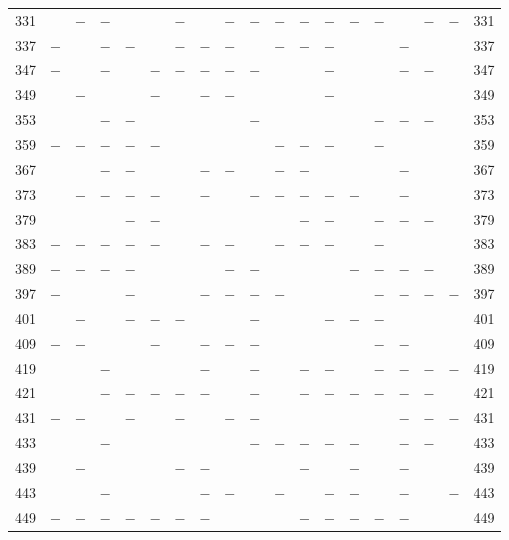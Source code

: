 \begin{center}
\begin{tabular}{r|c|c|c|c|c|c|c|c|c|c|c|c|c|c|c|c|c|r}
331 &  & $-$ & $-$ &  &  & $-$ &  & $-$ & $-$ & $-$ & $-$ & $-$ & $-$ & $-$ &  & $-$ & $-$ & 331\\
337 & $-$ &  & $-$ & $-$ &  & $-$ & $-$ & $-$ &  & $-$ & $-$ & $-$ &  &  & $-$ &  &  & 337\\
347 & $-$ &  & $-$ &  & $-$ & $-$ & $-$ & $-$ & $-$ &  &  & $-$ &  &  & $-$ & $-$ &  & 347\\
349 &  & $-$ &  &  & $-$ &  & $-$ & $-$ &  &  &  & $-$ &  &  &  &  &  & 349\\
353 &  &  & $-$ & $-$ &  &  &  &  & $-$ &  &  &  &  & $-$ & $-$ & $-$ &  & 353\\
359 & $-$ & $-$ & $-$ & $-$ & $-$ &  &  &  &  & $-$ & $-$ & $-$ &  & $-$ &  &  &  & 359\\
367 &  &  & $-$ & $-$ &  &  & $-$ & $-$ &  & $-$ & $-$ &  &  &  & $-$ &  &  & 367\\
373 &  & $-$ & $-$ & $-$ & $-$ &  & $-$ &  & $-$ & $-$ & $-$ & $-$ & $-$ &  & $-$ &  &  & 373\\
379 &  &  &  & $-$ & $-$ &  &  &  &  &  & $-$ & $-$ &  & $-$ & $-$ & $-$ &  & 379\\
383 & $-$ & $-$ & $-$ & $-$ & $-$ &  & $-$ & $-$ &  & $-$ & $-$ & $-$ &  & $-$ &  &  &  & 383\\
389 & $-$ & $-$ & $-$ & $-$ &  &  &  & $-$ & $-$ &  &  &  & $-$ & $-$ & $-$ & $-$ &  & 389\\
397 & $-$ &  &  & $-$ &  &  & $-$ & $-$ & $-$ & $-$ &  &  &  & $-$ & $-$ & $-$ & $-$ & 397\\
401 &  & $-$ &  & $-$ & $-$ & $-$ &  &  & $-$ &  &  & $-$ & $-$ & $-$ &  &  &  & 401\\
409 & $-$ & $-$ &  &  & $-$ &  & $-$ & $-$ & $-$ &  &  &  &  & $-$ & $-$ &  &  & 409\\
419 &  &  & $-$ &  &  &  & $-$ &  & $-$ &  & $-$ & $-$ &  & $-$ & $-$ & $-$ & $-$ & 419\\
421 &  &  & $-$ & $-$ & $-$ & $-$ & $-$ &  & $-$ &  & $-$ & $-$ & $-$ & $-$ & $-$ & $-$ &  & 421\\
431 & $-$ & $-$ &  & $-$ &  & $-$ &  & $-$ & $-$ &  &  &  &  &  & $-$ & $-$ & $-$ & 431\\
433 &  &  & $-$ &  &  &  &  &  & $-$ & $-$ & $-$ & $-$ & $-$ &  & $-$ & $-$ &  & 433\\
439 &  & $-$ &  &  &  & $-$ & $-$ &  &  &  & $-$ &  & $-$ &  & $-$ &  &  & 439\\
443 &  &  & $-$ &  &  &  & $-$ & $-$ &  & $-$ &  & $-$ & $-$ &  & $-$ &  & $-$ & 443\\
449 & $-$ & $-$ & $-$ & $-$ & $-$ & $-$ & $-$ &  &  &  & $-$ & $-$ & $-$ & $-$ & $-$ &  &  & 449\\

\end{tabular}
\end{center}
